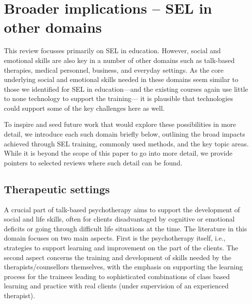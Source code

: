 \documentclass[prodmode,acmtochi]{acmsmall}
\newcommand{\rephrase}[1]{\textrm{\textrm{\textcolor{gray}{#1}}}}
\begin{document}
\section{Broader implications -- SEL in other domains}
\label{sec:linkDomains}
This review focusses primarily on SEL in education. However, social and emotional skills are also key in a number of other domains such as talk-based therapies, medical personnel, business, and everyday settings. As the core underlying social and emotional skills needed in these domains seem similar to those we identified for SEL in education---and the existing courses again use little to none technology to support the training--- it is plausible that technologies could support some of the key challenges here as well.

To inspire and seed future work that would explore these possibilities in more detail, we introduce each such domain briefly below, outlining the broad impacts achieved through SEL training, commonly used methods, and the key topic areas. While it is beyond the scope of this paper to go into more detail, we provide pointers to selected reviews where such detail can be found.
 
  



\subsection{Therapeutic settings}
A crucial part of talk-based psychotherapy aims to support the development of social and life skills, often for clients  disadvantaged by cognitive or emotional deficits or going through difficult life situations at the time. %
%
The literature in this domain focuses on two main aspects. First is the psychotherapy itself, i.e., strategies to support learning and improvement on the part of the clients. The second aspect concerns the training and development of skills needed by the therapists/counsellors themselves, with the emphasis on supporting the learning process for the trainees leading to sophisticated combinations of class based learning and practice with real clients (under supervision of an experienced therapist). 
\end{document}
